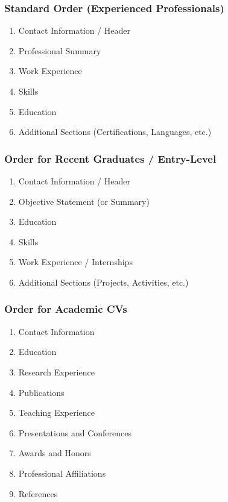 \documentclass[11pt,a4paper]{article}
\begin{document}
\subsubsection{Standard Order (Experienced Professionals)}

\begin{enumerate}
    \item Contact Information / Header
    \item Professional Summary
    \item Work Experience
    \item Skills
    \item Education
    \item Additional Sections (Certifications, Languages, etc.)
\end{enumerate}

\subsubsection{Order for Recent Graduates / Entry-Level}

\begin{enumerate}
    \item Contact Information / Header
    \item Objective Statement (or Summary)
    \item Education
    \item Skills
    \item Work Experience / Internships
    \item Additional Sections (Projects, Activities, etc.)
\end{enumerate}

\subsubsection{Order for Academic CVs}

\begin{enumerate}
    \item Contact Information
    \item Education
    \item Research Experience
    \item Publications
    \item Teaching Experience
    \item Presentations and Conferences
    \item Awards and Honors
    \item Professional Affiliations
    \item References
\end{enumerate}
\end{document}
